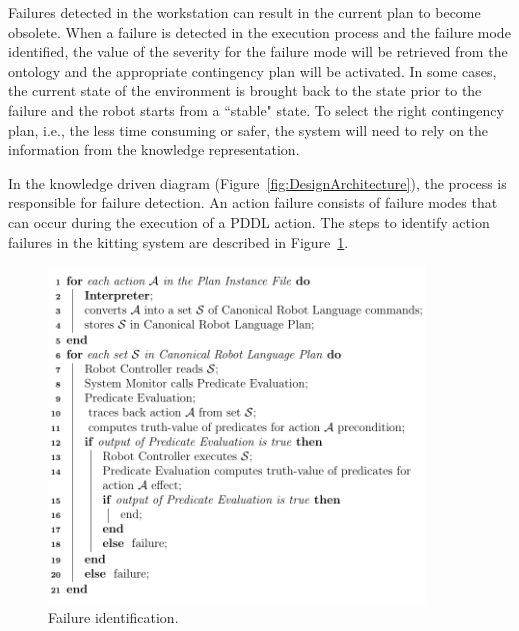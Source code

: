  Failures detected in the workstation can result in the current plan to become obsolete. When a failure is detected in the execution process and the failure mode identified, the value of the severity for the failure mode will be retrieved from the ontology and the appropriate contingency plan will be activated. In some cases, the current state of the environment is brought back to the state prior to the failure and the robot starts from a ``stable" state. To select the right contingency plan, i.e., the less time consuming or safer, the system will need to rely on the information from the knowledge representation.

 In the knowledge driven diagram (Figure~\ref{fig:DesignArchitecture}), the  process is responsible for failure detection. An action failure consists of failure modes that can occur during the execution of a PDDL action. The steps to identify action failures in the kitting system are described in Figure~\ref{fig:algo}.

\begin{figure}[h!t!]
  \centering
  \includegraphics[width=10cm]{images/algorithm.pdf}
  \caption{Failure identification.}
  \label{fig:algo}
\end{figure}

